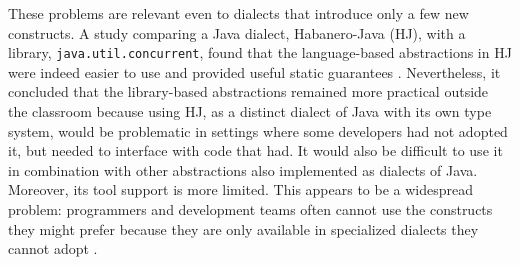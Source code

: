 \documentclass[9pt]{sigplanconf}
\newcommand{\lstinlinep}[1]{\lstinline[language=Python,basicstyle=\ttfamily\small,deletendkeywords={tuple,buffer,map}]{#1}}
\begin{document}
These problems are relevant even to dialects that introduce only a few new constructs. A study comparing a Java dialect, Habanero-Java (HJ), with a  library, \lstinlinep{java.util.concurrent}, found that the language-based abstractions in HJ were indeed easier to use and provided useful static guarantees \cite{cave2010comparing}. Nevertheless, it concluded that the library-based abstractions remained more practical outside the classroom because using HJ, as a distinct dialect of Java with its own type system, would be problematic in settings where some developers had not adopted it, but needed to interface with code that had. It would also be difficult to use it in combination with other abstractions also implemented as dialects of Java. Moreover, its tool support is more limited. 
This appears to be a widespread problem: programmers and development teams often cannot use  the constructs they might prefer because they are only available in specialized dialects they cannot  adopt \cite{Meyerovich:2012:SDR:2414721.2414724,Meyerovich:2013:EAP:2509136.2509515}. %

\end{document}
